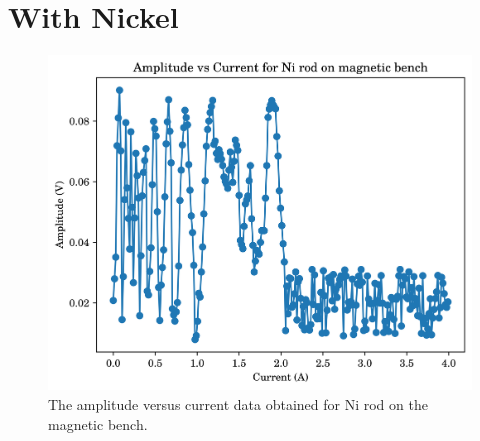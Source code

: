\section{With Nickel}
\begin{figure}[h!]
	\centering
	\includegraphics{data/mb-Ni-0}
	\caption{The amplitude versus current data obtained for Ni rod on the magnetic bench.}
	\label{fig:mb-ni-0}
\end{figure}


